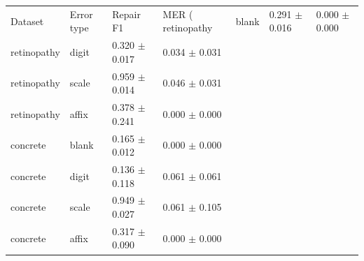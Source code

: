\begin{tabular}{llll}
\hline
Dataset & Error type & Repair F1 & MER (%
\hline
retinopathy & blank & 0.291 $\pm$ 0.016 & 0.000 $\pm$ 0.000 \\
retinopathy & digit & 0.320 $\pm$ 0.017 & 0.034 $\pm$ 0.031 \\
retinopathy & scale & 0.959 $\pm$ 0.014 & 0.046 $\pm$ 0.031 \\
retinopathy & affix & 0.378 $\pm$ 0.241 & 0.000 $\pm$ 0.000 \\
concrete & blank & 0.165 $\pm$ 0.012 & 0.000 $\pm$ 0.000 \\
concrete & digit & 0.136 $\pm$ 0.118 & 0.061 $\pm$ 0.061 \\
concrete & scale & 0.949 $\pm$ 0.027 & 0.061 $\pm$ 0.105 \\
concrete & affix & 0.317 $\pm$ 0.090 & 0.000 $\pm$ 0.000 \\
\hline
\end{tabular}
